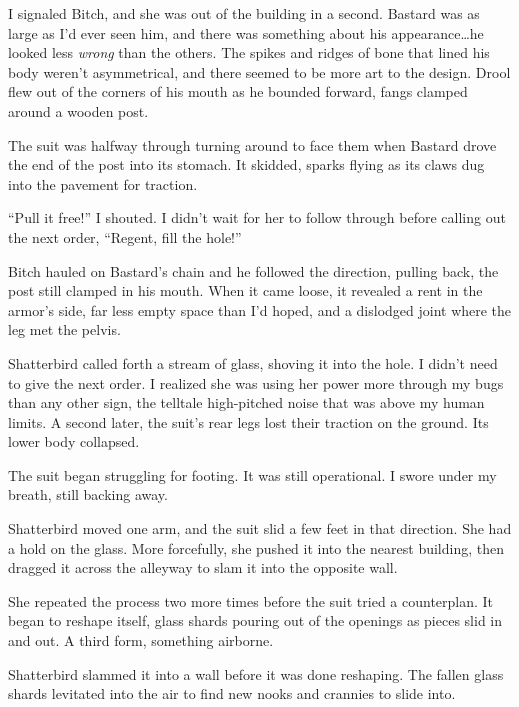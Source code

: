 I signaled Bitch, and she was out of the building in a second.  Bastard was as large as I'd ever seen him, and there was something about his appearance\ldots he looked less \emph{wrong} than the others.  The spikes and ridges of bone that lined his body weren't asymmetrical, and there seemed to be more art to the design.  Drool flew out of the corners of his mouth as he bounded forward, fangs clamped around a wooden post.



The suit was halfway through turning around to face them when Bastard drove the end of the post into its stomach.  It skidded, sparks flying as its claws dug into the pavement for traction.



``Pull it free!''  I shouted.  I didn't wait for her to follow through before calling out the next order, ``Regent, fill the hole!''



Bitch hauled on Bastard's chain and he followed the direction, pulling back, the post still clamped in his mouth.  When it came loose, it revealed a rent in the armor's side, far less empty space than I'd hoped, and a dislodged joint where the leg met the pelvis.



Shatterbird called forth a stream of glass, shoving it into the hole.  I didn't need to give the next order.  I realized she was using her power more through my bugs than any other sign, the telltale high-pitched noise that was above my human limits.  A second later, the suit's rear legs lost their traction on the ground.  Its lower body collapsed.



The suit began struggling for footing.  It was still operational.  I swore under my breath, still backing away.



Shatterbird moved one arm, and the suit slid a few feet in that direction.  She had a hold on the glass.  More forcefully, she pushed it into the nearest building, then dragged it across the alleyway to slam it into the opposite wall.



She repeated the process two more times before the suit tried a counterplan.  It began to reshape itself, glass shards pouring out of the openings as pieces slid in and out.  A third form, something airborne.



Shatterbird slammed it into a wall before it was done reshaping.  The fallen glass shards levitated into the air to find new nooks and crannies to slide into.



